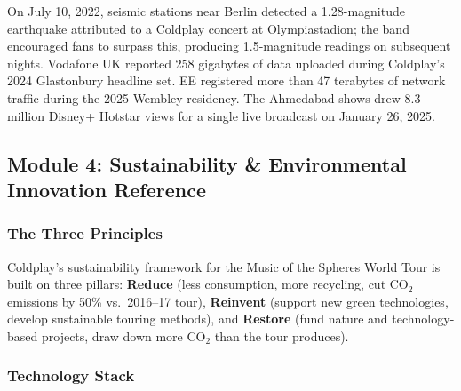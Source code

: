 \documentclass[11pt,letterpaper]{article}
\begin{document}
On July 10, 2022, seismic stations near Berlin detected a 1.28-magnitude earthquake attributed to a Coldplay concert at Olympiastadion; the band encouraged fans to surpass this, producing 1.5-magnitude readings on subsequent nights. Vodafone UK reported 258 gigabytes of data uploaded during Coldplay's 2024 Glastonbury headline set. EE registered more than 47 terabytes of network traffic during the 2025 Wembley residency. The Ahmedabad shows drew 8.3 million Disney+ Hotstar views for a single live broadcast on January 26, 2025.

\subsection{Module 4: Sustainability \& Environmental Innovation Reference}

\subsubsection{The Three Principles}

Coldplay's sustainability framework for the Music of the Spheres World Tour is built on three pillars: \textbf{Reduce} (less consumption, more recycling, cut CO$_2$ emissions by 50\% vs.\ 2016--17 tour), \textbf{Reinvent} (support new green technologies, develop sustainable touring methods), and \textbf{Restore} (fund nature and technology-based projects, draw down more CO$_2$ than the tour produces).

\subsubsection{Technology Stack}
\end{document}
